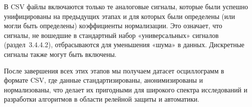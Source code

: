 В CSV файлы включаются только те аналоговые сигналы, которые были успешно унифицированы на предыдущих этапах и для которых были определены (или могли быть определены) коэффициенты нормализации. Это означает, что сигналы, не вошедшие в стандартный набор «универсальных» сигналов (раздел~3.4.4.2), отбрасываются для уменьшения «шума» в данных. Дискретные сигналы также могут быть включены.

После завершения всех этих этапов мы получаем датасет осциллограмм в формате CSV, где данные стандартизированы, анонимизированы и нормализованы, что делает их пригодными для широкого спектра исследований и разработки алгоритмов в области релейной защиты и автоматики.

